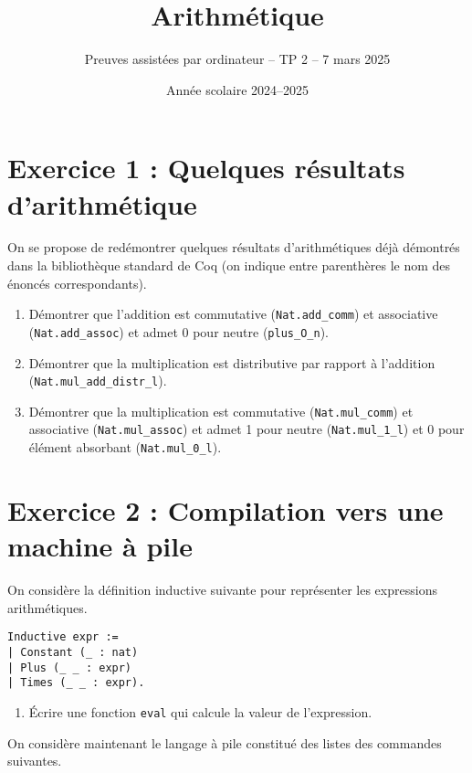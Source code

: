 \documentclass{article}
\begin{document}
\title{Arithmétique}
\author{Preuves assistées par ordinateur -- TP 2 -- 7 mars 2025}
\date{Année scolaire 2024--2025}
\maketitle

\section*{Exercice 1 : Quelques résultats d'arithmétique}

On se propose de redémontrer quelques résultats d'arithmétiques déjà démontrés dans la bibliothèque standard de Coq (on indique entre parenthères le nom des énoncés correspondants).

\begin{enumerate}
\item Démontrer que l'addition est commutative (\texttt{Nat.add_comm}) et associative (\texttt{Nat.add_assoc}) et admet 0 pour neutre (\texttt{plus_O_n}).
\item Démontrer que la multiplication est distributive par rapport à l'addition (\texttt{Nat.mul_add_distr_l}).
\item Démontrer que la multiplication est commutative (\texttt{Nat.mul_comm}) et associative (\texttt{Nat.mul_assoc}) et admet 1 pour neutre (\texttt{Nat.mul_1_l}) et 0 pour élément absorbant (\texttt{Nat.mul_0_l}).
\end{enumerate}

\section*{Exercice 2 : Compilation vers une machine à pile}
On considère la définition inductive suivante pour représenter les expressions arithmétiques.

\begin{verbatim}
Inductive expr :=
| Constant (_ : nat)
| Plus (_ _ : expr)
| Times (_ _ : expr).
\end{verbatim}

\begin{enumerate}

\item Écrire une fonction \texttt{eval} qui calcule la valeur de l'expression.
\end{enumerate}

On considère maintenant le langage à pile constitué des listes des commandes suivantes.
\end{document}
